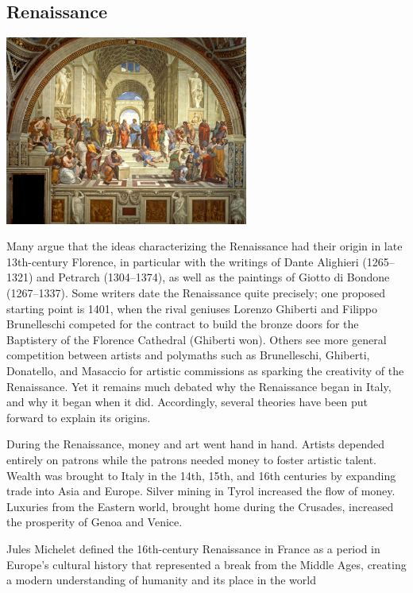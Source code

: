 \documentclass[11pt]{report}
\begin{document}
\subsection{Renaissance}
\vspace{2mm}\begin{center}\includegraphics[width=8cm]{./img/renaissance.jpg}\end{center}
Many argue that the ideas characterizing the Renaissance had their origin in late 13th-century Florence, in particular with the writings of Dante Alighieri (1265–1321) and Petrarch (1304–1374), as well as the paintings of Giotto di Bondone (1267–1337). Some writers date the Renaissance quite precisely; one proposed starting point is 1401, when the rival geniuses Lorenzo Ghiberti and Filippo Brunelleschi competed for the contract to build the bronze doors for the Baptistery of the Florence Cathedral (Ghiberti won). Others see more general competition between artists and polymaths such as Brunelleschi, Ghiberti, Donatello, and Masaccio for artistic commissions as sparking the creativity of the Renaissance. Yet it remains much debated why the Renaissance began in Italy, and why it began when it did. Accordingly, several theories have been put forward to explain its origins.

During the Renaissance, money and art went hand in hand. Artists depended entirely on patrons while the patrons needed money to foster artistic talent. Wealth was brought to Italy in the 14th, 15th, and 16th centuries by expanding trade into Asia and Europe. Silver mining in Tyrol increased the flow of money. Luxuries from the Eastern world, brought home during the Crusades, increased the prosperity of Genoa and Venice.

Jules Michelet defined the 16th-century Renaissance in France as a period in Europe's cultural history that represented a break from the Middle Ages, creating a modern understanding of humanity and its place in the world
\end{document}
